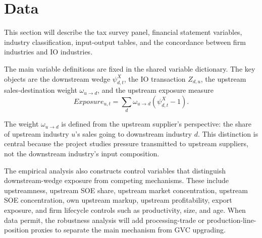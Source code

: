\section{Data}

This section will describe the tax survey panel, financial statement variables, industry classification, input-output tables, and the concordance between firm industries and IO industries.

The main variable definitions are fixed in the shared variable dictionary. The key objects are the downstream wedge \(\psi^X_{d,t}\), the IO transaction \(Z_{d,u}\), the upstream sales-destination weight \(\omega_{u \to d}\), and the upstream exposure measure
\[
  Exposure_{u,t} = \sum_d \omega_{u \to d}(\psi^X_{d,t} - 1).
\]

The weight \(\omega_{u \to d}\) is defined from the upstream supplier's perspective: the share of upstream industry \(u\)'s sales going to downstream industry \(d\). This distinction is central because the project studies pressure transmitted to upstream suppliers, not the downstream industry's input composition.

The empirical analysis also constructs control variables that distinguish downstream-wedge exposure from competing mechanisms. These include upstreamness, upstream SOE share, upstream market concentration, upstream SOE concentration, own upstream markup, upstream profitability, export exposure, and firm lifecycle controls such as productivity, size, and age. When data permit, the robustness analysis will add processing-trade or production-line-position proxies to separate the main mechanism from GVC upgrading.
